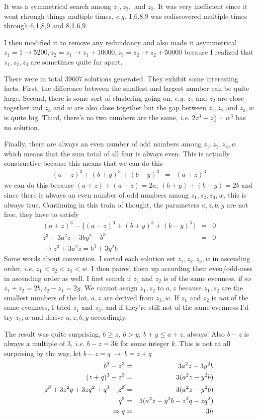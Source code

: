 \documentclass[aps,preprint,preprintnumbers,nofootinbib,showpacs,prd]{revtex4-1}
\newcommand{\ie}{{\it i.e.} }
\newcommand{\eg}{{\it e.g.} }
\newcommand{\nbea}{\begin{eqnarray*}}
\newcommand{\neea}{\end{eqnarray*}}
\begin{document}
It was a symmetrical search among $z_1, z_2,$ and $z_3$. It was very inefficient since it went rhrough things multiple times, \eg 1,6,8,9 was rediscovered multiple times through 6,1,8,9 and 8,1,6,9.

I then modified it to remove any redundancy and also made it asymmetrical $z_1 = 1 \to 5200, z_2 = z_1 \to z_1 + 10000, z_3 = z_2 \to z_2 + 50000$ because I realized that $z_1,z_2,z_3$ are sometimes quite far apart.

There were in total 39607 solutions generated. They exhibit some interesting facts. First, the difference between the smallest and largest number can be quite large. Second, there is some sort of clustering going on, \eg $z_1$ and $z_2$ are close together and $z_3$ and $w$ are also close together but the gap between $z_1,z_2$ and $z_3,w$ is quite big. Third, there's no two numbers are the same, \ie $2 z^3 + z_3^3 = w^3$ has no solution.

Finally, there are always an even number of odd numbers among $z_1,z_2,z_3,w$ which means that the sum total of all four is always even. This is actually constructive because this means that we can do this
%
\nbea
(a-z)^3 + (b+y)^3 + (b-y)^3 & = & (a+z)^3
\neea
%
we can do this because $(a+z) + (a-z) = 2a,~(b+y) + (b-y) = 2b$ and since there is always an even number of odd numbers among $z_1,z_2,z_3,w$, this is always true. Continuing in this train of thought, the parameters $a,z,b,y$ are not free, they have to satisfy
%
\nbea
(a+z)^3 - \{(a-z)^3 + (b+y)^3 + (b-y)^3\} & = & 0 \\
z^3 + 3a^2z - 3by^2 - b^3 & = & 0 \\
\to z^3 + 3a^2z = b^3 + 3y^2b
\neea
%
Some words about convention. I sorted each solution set $z_1,z_2,z_3,w$ in ascending order, \ie $z_1 < z_2 < z_3 < w$. I then paired them up according their even/odd-ness in ascending order as well. I first search if $z_1$ and $z_2$ is of the same evenness, if so $z_1 + z_2 = 2b, z_2 - z_1 = 2y$. We cannot assign $z_1,z_2$ to $a,z$ because $z_1,z_2$ are the smallest numbers of the lot, $a,z$ are derived from $z_3,w$. If $z_1$ and $z_2$ is {\it not} of the same evenness, I tried $z_1$ and $z_3$, and if they're still not of the same evenness I'd try $z_1,w$ and derive $a,z,b,y$ accordingly. 

The result was quite surprising, $b \ge z, ~ b > y,~ b+y \le a+z$, always! Also $b-z$ is always a multiple of 3, \ie $b-z = 3k$ for some integer $k$. This is not at all surprising by the way, let $b - z = q ~\to~ b = z + q$
%
\nbea
b^3 - z^3 & = & 3a^2z - 3y^2b \\
(z + q)^3 - z^3 & = & 3(a^2z - y^2b) \\
\cancel{z^3} + 3z^2q + 3zq^2 + q^3 - \cancel{z^3} & = & 3 (a^2z - y^2b) \\
q^3 & = & 3 (a^2z - y^2b - z^2q - zq^2) \\
\Rightarrow q & = & 3 h
\neea
%
\end{document}
